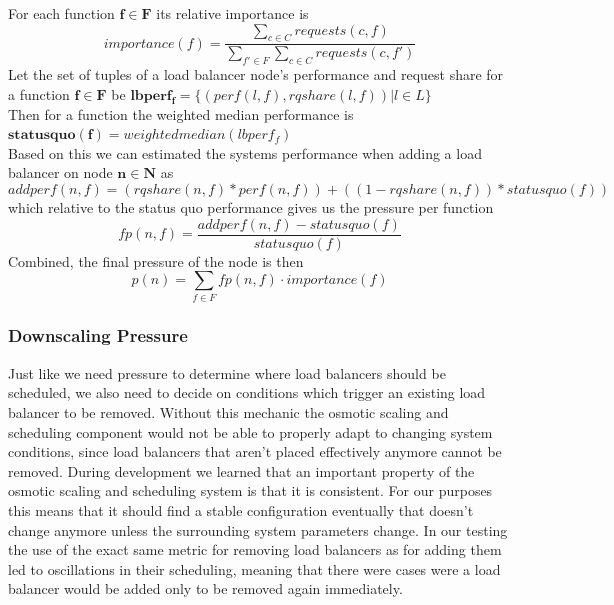 \documentclass[draft,final]{vutinfth} %
\begin{document}
For each function $\mathbf{f \in F}$ its relative importance is
\[importance(f) = \frac{\sum_{c \in C}requests(c,f)}{\sum_{f' \in F}\sum_{c \in C}requests(c,f')} \]
Let the set of tuples of a load balancer node's performance and request share for a function $\mathbf{f \in F}$ be $\mathbf{lbperf_{f}} = \{(perf(l,f), rqshare(l,f)) | l \in L\}$\\
Then for a function the weighted median performance is $\mathbf{statusquo(f)} = weightedmedian(lbperf_{f})$\\
Based on this we can estimated the systems performance when adding a load balancer on node $\mathbf{n \in N}$ as
\[ addperf(n,f) = (rqshare(n,f) * perf(n,f)) + ((1 - rqshare(n,f)) * statusquo(f))\]
which relative to the status quo performance gives us the pressure per function
\[ fp(n, f) = \frac{addperf(n,f) - statusquo(f)}{statusquo(f)}\]
Combined, the final pressure of the node is then
\[p(n) = \sum_{f \in F}fp(n,f) \cdot importance(f)\]

\subsubsection{Downscaling Pressure}
Just like we need pressure to determine where load balancers should be scheduled, we also need to decide on conditions which trigger an existing load balancer to be removed.
Without this mechanic the osmotic scaling and scheduling component would not be able to properly adapt to changing system conditions, since load balancers that aren't placed effectively anymore cannot be removed.
During development we learned that an important property of the osmotic scaling and scheduling system is that it is consistent.
For our purposes this means that it should find a stable configuration eventually that doesn't change anymore unless the surrounding system parameters change.
In our testing the use of the exact same metric for removing load balancers as for adding them led to oscillations in their scheduling, meaning that there were cases were a load balancer would be added only to be removed again immediately.
\end{document}

